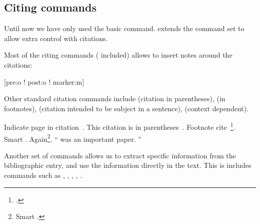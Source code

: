 \begin{example}[standalone,
  biber,
  biber_dir=../src/examples/,
  paperwidth=7cm,
  paperheight=3cm,
]
\usepackage[maxnames=4]{biblatex}

\sloppy

\nocite{lshort}
\printbibliography[heading=none]


\end{example}

\begin{example}[standalone,
  biber,
  biber_dir=../src/examples/,
  paperwidth=7cm,
  paperheight=3cm,
]
\usepackage[minnames=2]{biblatex}

\sloppy

\nocite{lshort}
\printbibliography[heading=none]


\end{example}

\subsection{Citing commands}

Until now we have only used the basic  command.  extends
the command set to allow extra control with
citations.

Most of the citing commands ( included) allows to insert notes
around the citations:
\begin{lscommand}
  [pre:o ! post:o ! marker:m]
\end{lscommand}
Other standard citation commands include  (citation in
parentheses),  (in footnotes),  (citation intended to
be subject in a sentence),  (context dependent).

\begin{example}[standalone,
  biber,
  biber_dir=../src/examples/,
  paperwidth=5cm,
  paperheight=5cm,
]
\usepackage[style=alphabetic]{biblatex}
\usepackage{csquotes}

\sloppy

Indicate page in citation~\cite[25]{lshort}. 
This citation is in
parentheses~\parencite{curie}.
Footnote cite~\footcite{dream}.
Smart \smartcite[See][78]{lshort}.
Again\footnote{Smart
\smartcite[12--56]{dream}.}.
\enquote{\Textcite{curie}
  was an important paper.
}

\end{example}

Another set of commands allows us to extract specific information from
the bibliographic entry, and use the information directly in the text. This is includes commands such as ,
, , , .

